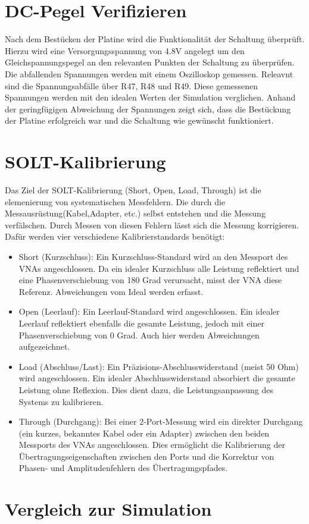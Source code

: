 \section{DC-Pegel Verifizieren}
Nach dem Bestücken der Platine wird die Funktionalität der Schaltung überprüft. Hierzu wird eine Versorgungsspannung von 
4.8V angelegt um den Gleichspannungspegel an den relevanten Punkten der Schaltung zu überprüfen. Die abfallenden 
Spannungen werden mit einem Oszilloskop gemessen. Releavnt sind die Spannungsabfälle über R47, R48 und R49. Diese gemessenen
Spannungen werden mit den idealen Werten 
der Simulation verglichen. Anhand der geringfügigen Abweichung der Spannungen zeigt sich, dass die Bestückung 
der Platine erfolgreich war und die Schaltung wie gewünscht funktioniert.

\section{SOLT-Kalibrierung}
Das Ziel der SOLT-Kalibrierung (Short, Open, Load, Through) ist die elemenierung
von systematischen Messfehlern. Die durch die Messausrüstung(Kabel,Adapter, etc.)
selbst entstehen und die Messung verfälschen.
Durch Messen von diesen Fehlern lässt sich die Messung korrigieren.
Dafür werden vier verschiedene Kalibrierstandards benötigt:
\begin{itemize}
    \item Short (Kurzschluss): Ein Kurzschluss-Standard wird an den Messport des VNAs angeschlossen. Da ein idealer Kurzschluss alle Leistung reflektiert und eine Phasenverschiebung von 180 Grad verursacht, misst der VNA diese Referenz. Abweichungen vom Ideal werden erfasst. 
    \item Open (Leerlauf): Ein Leerlauf-Standard wird angeschlossen. Ein idealer Leerlauf reflektiert ebenfalls die gesamte Leistung, jedoch mit einer Phasenverschiebung von 0 Grad. Auch hier werden Abweichungen aufgezeichnet.
    \item Load (Abschluss/Last): Ein Präzisions-Abschlusswiderstand (meist 50 Ohm) wird angeschlossen. Ein idealer Abschlusswiderstand absorbiert die gesamte Leistung ohne Reflexion. Dies dient dazu, die Leistungsanpassung des Systems zu kalibrieren.
    \item Through (Durchgang): Bei einer 2-Port-Messung wird ein direkter Durchgang (ein kurzes, bekanntes Kabel oder ein Adapter) zwischen den beiden Messports des VNAs angeschlossen. Dies ermöglicht die Kalibrierung der Übertragungseigenschaften zwischen den Ports und die Korrektur von Phasen- und Amplitudenfehlern des Übertragungspfades.
\end{itemize}
\section{Vergleich zur Simulation}
\clearpage
